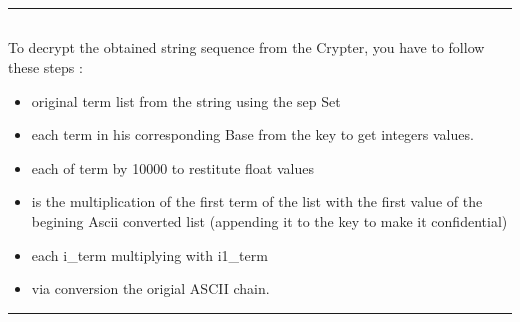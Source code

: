 \documentclass[letterpaper,10pt,english]{sphinxmanual}
\begin{document}
\bigskip\hrule\bigskip



\subsection{}
\label{\detokenize{DescriptionofAltDecrypterv1:algorithm}}
\sphinxAtStartPar
To decrypt the obtained string sequence from the Crypter, you have to follow these steps :
\begin{itemize}
\item {} 
\sphinxAtStartPar
{} original term list from the string using the sep Set

\item {} 
\sphinxAtStartPar
{} each term in his corresponding Base from the key to get integers values.

\item {} 
\sphinxAtStartPar
{} each of term by 10000 to restitute float values

\item {} 
\sphinxAtStartPar
{} is the multiplication of the first term of the list with the first value of the begining Ascii converted list (appending it to the key to make it confidential)

\item {} 
\sphinxAtStartPar
{} each i\_term multiplying with i\sphinxhyphen{}1\_term

\item {} 
\sphinxAtStartPar
{} via conversion the origial ASCII chain.

\end{itemize}


\bigskip\hrule\bigskip
\end{document}
